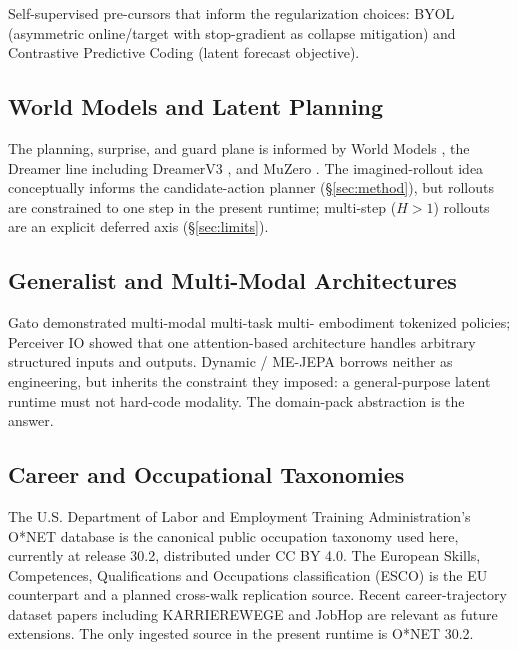 \documentclass[10pt,twocolumn,letterpaper]{article}
\begin{document}
Self-supervised pre-cursors that inform the regularization choices:
BYOL \citep{grill2020byol} (asymmetric online/target with
stop-gradient as collapse mitigation) and Contrastive Predictive
Coding \citep{vandenoord2019cpc} (latent forecast objective).

\subsection{World Models and Latent Planning}

The planning, surprise, and guard plane is informed by World Models
\citep{ha2018worldmodels}, the Dreamer line including DreamerV3
\citep{hafner2023dreamerv3}, and MuZero \citep{schrittwieser2019muzero}.
The imagined-rollout idea conceptually informs the candidate-action
planner (\S\ref{sec:method}), but rollouts are constrained to one
step in the present runtime; multi-step ($H{>}1$) rollouts are an
explicit deferred axis (\S\ref{sec:limits}).

\subsection{Generalist and Multi-Modal Architectures}

Gato \citep{reed2022gato} demonstrated multi-modal multi-task multi-
embodiment tokenized policies; Perceiver IO
\citep{jaegle2022perceiverio} showed that one attention-based
architecture handles arbitrary structured inputs and outputs.
Dynamic / ME-JEPA borrows neither as engineering, but inherits the
constraint they imposed: a general-purpose latent runtime must not
hard-code modality. The domain-pack abstraction is the answer.

\subsection{Career and Occupational Taxonomies}

The U.S. Department of Labor and Employment Training
Administration's O*NET database \citep{onet2026} is the canonical
public occupation taxonomy used here, currently at release 30.2,
distributed under CC BY 4.0. The European Skills, Competences,
Qualifications and Occupations classification (ESCO)
\citep{esco2025} is the EU counterpart and a planned cross-walk
replication source. Recent career-trajectory dataset papers including KARRIEREWEGE
\citep{senger2024karrierewege} and JobHop \citep{johary2025jobhop}
are relevant as future extensions. The only ingested source in the
present runtime is O*NET 30.2.
\end{document}
